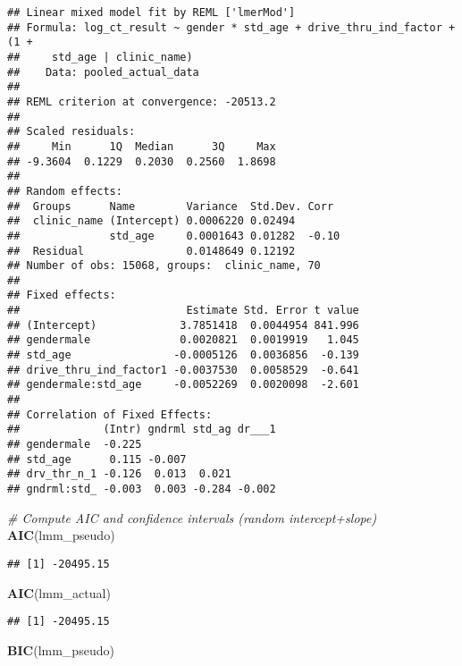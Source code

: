 \documentclass[
]{article}
\newenvironment{Shaded}{\begin{snugshade}}{\end{snugshade}}
\newcommand{\CommentTok}[1]{\textcolor[rgb]{0.56,0.35,0.01}{\textit{#1}}}
\newcommand{\FunctionTok}[1]{\textcolor[rgb]{0.13,0.29,0.53}{\textbf{#1}}}
\newcommand{\NormalTok}[1]{#1}
\begin{document}
\begin{verbatim}
## Linear mixed model fit by REML ['lmerMod']
## Formula: log_ct_result ~ gender * std_age + drive_thru_ind_factor + (1 +  
##     std_age | clinic_name)
##    Data: pooled_actual_data
## 
## REML criterion at convergence: -20513.2
## 
## Scaled residuals: 
##     Min      1Q  Median      3Q     Max 
## -9.3604  0.1229  0.2030  0.2560  1.8698 
## 
## Random effects:
##  Groups      Name        Variance  Std.Dev. Corr 
##  clinic_name (Intercept) 0.0006220 0.02494       
##              std_age     0.0001643 0.01282  -0.10
##  Residual                0.0148649 0.12192       
## Number of obs: 15068, groups:  clinic_name, 70
## 
## Fixed effects:
##                          Estimate Std. Error t value
## (Intercept)             3.7851418  0.0044954 841.996
## gendermale              0.0020821  0.0019919   1.045
## std_age                -0.0005126  0.0036856  -0.139
## drive_thru_ind_factor1 -0.0037530  0.0058529  -0.641
## gendermale:std_age     -0.0052269  0.0020098  -2.601
## 
## Correlation of Fixed Effects:
##             (Intr) gndrml std_ag dr___1
## gendermale  -0.225                     
## std_age      0.115 -0.007              
## drv_thr_n_1 -0.126  0.013  0.021       
## gndrml:std_ -0.003  0.003 -0.284 -0.002
\end{verbatim}

\begin{Shaded}
\begin{Highlighting}[]
\CommentTok{\# Compute AIC and confidence intervals (random intercept+slope)}
\FunctionTok{AIC}\NormalTok{(lmm\_pseudo)}
\end{Highlighting}
\end{Shaded}

\begin{verbatim}
## [1] -20495.15
\end{verbatim}

\begin{Shaded}
\begin{Highlighting}[]
\FunctionTok{AIC}\NormalTok{(lmm\_actual)}
\end{Highlighting}
\end{Shaded}

\begin{verbatim}
## [1] -20495.15
\end{verbatim}

\begin{Shaded}
\begin{Highlighting}[]
\FunctionTok{BIC}\NormalTok{(lmm\_pseudo)}
\end{Highlighting}
\end{Shaded}
\end{document}
